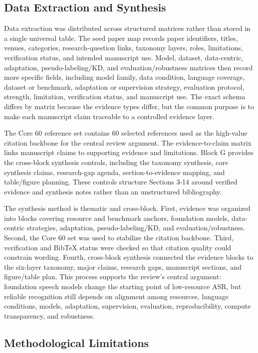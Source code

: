 \documentclass[pdflatex,sn-basic,iicol]{sn-jnl}
\theoremstyle{thmstyleone}
\theoremstyle{thmstyletwo}
\theoremstyle{thmstylethree}
\begin{document}
\subsection{Data Extraction and Synthesis}

Data extraction was distributed across structured matrices rather than stored in a single universal table. The seed paper map records paper identifiers, titles, venues, categories, research-question links, taxonomy layers, roles, limitations, verification status, and intended manuscript use. Model, dataset, data-centric, adaptation, pseudo-labeling/KD, and evaluation/robustness matrices then record more specific fields, including model family, data condition, language coverage, dataset or benchmark, adaptation or supervision strategy, evaluation protocol, strength, limitation, verification status, and manuscript use. The exact schema differs by matrix because the evidence types differ, but the common purpose is to make each manuscript claim traceable to a controlled evidence layer.

The Core 60 reference set contains 60 selected references used as the high-value citation backbone for the central review argument. The evidence-to-claim matrix links manuscript claims to supporting evidence and limitations. Block G provides the cross-block synthesis controls, including the taxonomy synthesis, core synthesis claims, research-gap agenda, section-to-evidence mapping, and table/figure planning. These controls structure Sections 3-14 around verified evidence and synthesis notes rather than an unstructured bibliography.

The synthesis method is thematic and cross-block. First, evidence was organized into blocks covering resource and benchmark anchors, foundation models, data-centric strategies, adaptation, pseudo-labeling/KD, and evaluation/robustness. Second, the Core 60 set was used to stabilize the citation backbone. Third, verification and BibTeX status were checked so that citation quality could constrain wording. Fourth, cross-block synthesis connected the evidence blocks to the six-layer taxonomy, major claims, research gaps, manuscript sections, and figure/table plan. This process supports the review's central argument: foundation speech models change the starting point of low-resource ASR, but reliable recognition still depends on alignment among resources, language conditions, models, adaptation, supervision, evaluation, reproducibility, compute transparency, and robustness.

\subsection{Methodological Limitations}
\end{document}
